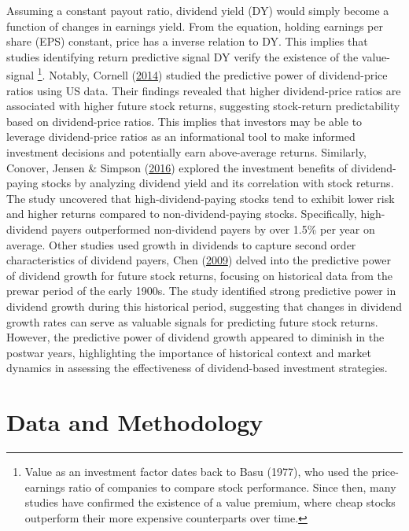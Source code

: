 \documentclass[11pt,preprint, authoryear]{elsarticle}
\numberwithin{equation}{section}
\numberwithin{figure}{section}
\numberwithin{table}{section}
\let\rmarkdownfootnote\footnote%
\def\footnote{\protect\rmarkdownfootnote}
\begin{document}
Assuming a constant payout ratio, dividend yield (DY) would simply
become a function of changes in earnings yield. From the equation,
holding earnings per share (EPS) constant, price has a inverse relation
to DY. This implies that studies identifying return predictive signal DY
verify the existence of the value-signal \footnote{Value as an
  investment factor dates back to Basu (1977), who used the
  price-earnings ratio of companies to compare stock performance. Since
  then, many studies have confirmed the existence of a value premium,
  where cheap stocks outperform their more expensive counterparts over
  time.}. Notably, Cornell
(\protect\hyperlink{ref-cornell2014dividend}{2014}) studied the
predictive power of dividend-price ratios using US data. Their findings
revealed that higher dividend-price ratios are associated with higher
future stock returns, suggesting stock-return predictability based on
dividend-price ratios. This implies that investors may be able to
leverage dividend-price ratios as an informational tool to make informed
investment decisions and potentially earn above-average returns.
Similarly, Conover, Jensen \& Simpson
(\protect\hyperlink{ref-conover2016difference}{2016}) explored the
investment benefits of dividend-paying stocks by analyzing dividend
yield and its correlation with stock returns. The study uncovered that
high-dividend-paying stocks tend to exhibit lower risk and higher
returns compared to non-dividend-paying stocks. Specifically,
high-dividend payers outperformed non-dividend payers by over 1.5\% per
year on average. Other studies used growth in dividends to capture
second order characteristics of dividend payers, Chen
(\protect\hyperlink{ref-chen2009reversal}{2009}) delved into the
predictive power of dividend growth for future stock returns, focusing
on historical data from the prewar period of the early 1900s. The study
identified strong predictive power in dividend growth during this
historical period, suggesting that changes in dividend growth rates can
serve as valuable signals for predicting future stock returns. However,
the predictive power of dividend growth appeared to diminish in the
postwar years, highlighting the importance of historical context and
market dynamics in assessing the effectiveness of dividend-based
investment strategies.

\newpage

\hypertarget{data-and-methodology}{%
\section*{Data and Methodology}\label{data-and-methodology}}
\end{document}
